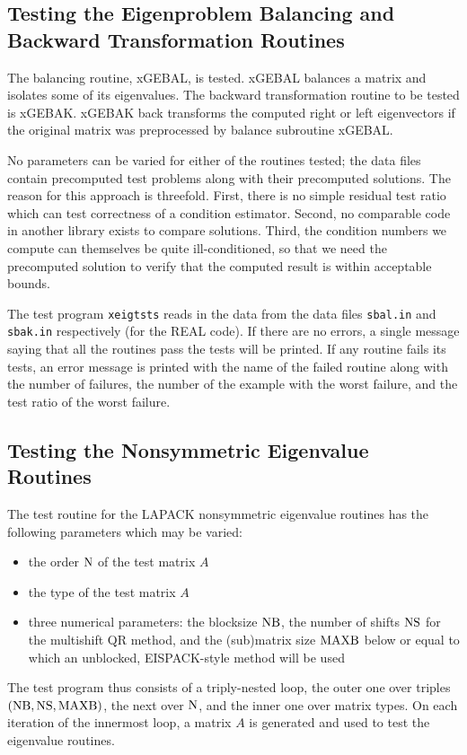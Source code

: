 \subsection{Testing the Eigenproblem Balancing and Backward Transformation Routines}
\dent
The balancing routine, xGEBAL, is tested.  xGEBAL balances a matrix and
isolates some of its eigenvalues.  The backward transformation routine
to be tested is xGEBAK.  xGEBAK back transforms the computed right or
left eigenvectors if the original matrix was preprocessed by balance
subroutine xGEBAL.

No parameters can be varied for either of the routines tested; the data
files contain precomputed test
problems along with their precomputed solutions. The reason for this
approach is threefold. First, there is no simple residual test ratio
which can
test correctness of a condition estimator. Second, no comparable code
in another library exists to compare solutions. Third, the condition
numbers we compute can themselves be quite ill-conditioned, so that
we need the precomputed solution to verify that the computed result
is within acceptable bounds.

The test program {\tt xeigtsts} reads in the data from the data files
{\tt sbal.in} and {\tt sbak.in} respectively (for the REAL code).
If there are no errors, a single message saying that all the routines
pass
the tests will be printed.
If any routine fails its tests, an error message is printed with the name of the
failed routine along with the number of failures, the number of the
example
with the worst failure, and the test ratio of the worst failure.

\subsection{Testing the Nonsymmetric Eigenvalue Routines}

\dent
The test routine for the LAPACK nonsymmetric eigenvalue routines
has the following parameters which may be varied:
\begin{itemize}
\item	the order ${\rm N}$ of the test matrix $A$
\item	the type of the test matrix $A$
\item	three numerical parameters: the blocksize ${\rm NB}$,
	the number of shifts ${\rm NS}$ for the multishift QR method, and
	the (sub)matrix size ${\rm MAXB}$ below or equal to which an
	unblocked, EISPACK-style method will be used
\end{itemize}
\begin{sloppypar}
\noindent
The test program thus consists of a triply-nested
loop, the outer one over triples $({\rm NB},{\rm NS},{\rm MAXB})$,
the next over ${\rm N}$, and the inner one over matrix types.
On each iteration of the innermost loop,
a matrix $A$ is generated and used
to test the eigenvalue routines.
\end{sloppypar}

